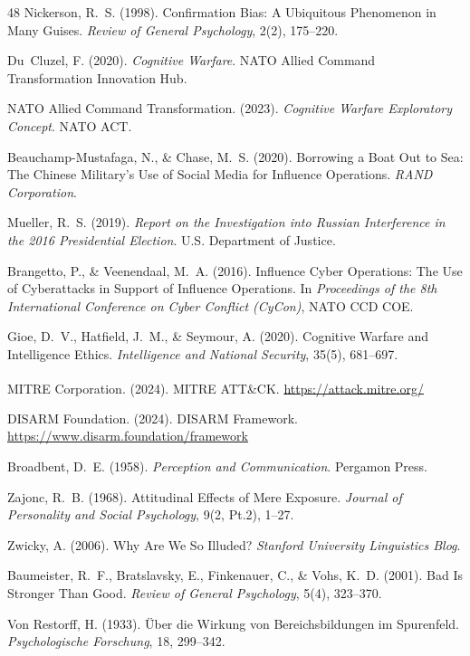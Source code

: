 \documentclass[11pt,a4paper]{article}
\begin{document}
\begin{thebibliography}{48}
Nickerson, R.~S. (1998). Confirmation Bias: A Ubiquitous Phenomenon in Many Guises. \textit{Review of General Psychology}, 2(2), 175--220.

Du~Cluzel, F. (2020). \textit{Cognitive Warfare}. NATO Allied Command Transformation Innovation Hub.

NATO Allied Command Transformation. (2023). \textit{Cognitive Warfare Exploratory Concept}. NATO ACT.

Beauchamp-Mustafaga, N., \& Chase, M.~S. (2020). Borrowing a Boat Out to Sea: The Chinese Military's Use of Social Media for Influence Operations. \textit{RAND Corporation}.

Mueller, R.~S. (2019). \textit{Report on the Investigation into Russian Interference in the 2016 Presidential Election}. U.S. Department of Justice.

Brangetto, P., \& Veenendaal, M.~A. (2016). Influence Cyber Operations: The Use of Cyberattacks in Support of Influence Operations. In \textit{Proceedings of the 8th International Conference on Cyber Conflict (CyCon)}, NATO CCD COE.

Gioe, D.~V., Hatfield, J.~M., \& Seymour, A. (2020). Cognitive Warfare and Intelligence Ethics. \textit{Intelligence and National Security}, 35(5), 681--697.

MITRE Corporation. (2024). MITRE ATT\&CK\textsuperscript{\textregistered}. \url{https://attack.mitre.org/}

DISARM Foundation. (2024). DISARM Framework. \url{https://www.disarm.foundation/framework}

Broadbent, D.~E. (1958). \textit{Perception and Communication}. Pergamon Press.

Zajonc, R.~B. (1968). Attitudinal Effects of Mere Exposure. \textit{Journal of Personality and Social Psychology}, 9(2, Pt.2), 1--27.

Zwicky, A. (2006). Why Are We So Illuded? \textit{Stanford University Linguistics Blog}.

Baumeister, R.~F., Bratslavsky, E., Finkenauer, C., \& Vohs, K.~D. (2001). Bad Is Stronger Than Good. \textit{Review of General Psychology}, 5(4), 323--370.

Von Restorff, H. (1933). \"Uber die Wirkung von Bereichsbildungen im Spurenfeld. \textit{Psychologische Forschung}, 18, 299--342.


\end{thebibliography}
\end{document}
